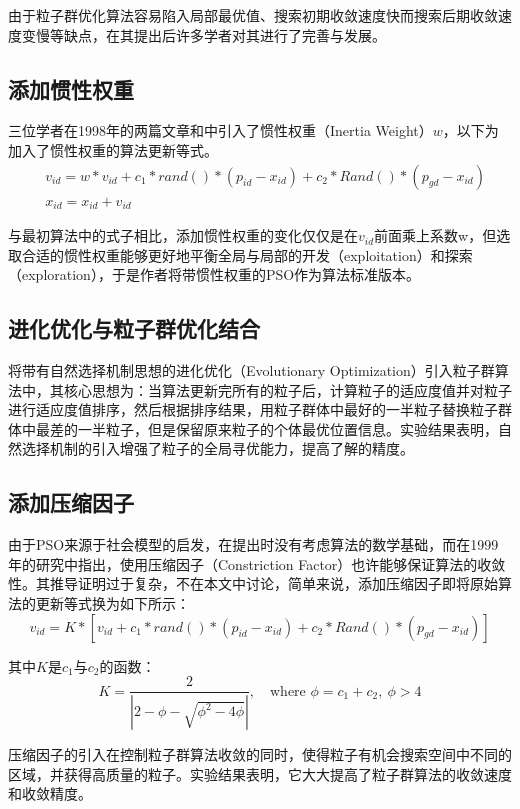 \documentclass[lang=cn,12pt,a4paper,cite=authoryear]{elegantpaper}
\begin{document}
由于粒子群优化算法容易陷入局部最优值、搜索初期收敛速度快而搜索后期收敛速度变慢等缺点，在其提出后许多学者对其进行了完善与发展。

\subsection{添加惯性权重}

三位学者在1998年的两篇文章\citep{shi1998modified}和\citep{shi1998parameter}中引入了惯性权重（Inertia Weight）$w$，以下为加入了惯性权重的算法更新等式。
\begin{align*}
& v_{id} = w*v_{id} + c_1 * rand() * (p_{id} - x_{id}) + c_2 * Rand() * (p_{gd} - x_{id})\\
& x_{id} = x_{id} + v_{id}
\end{align*}

与最初算法中的式子相比，添加惯性权重的变化仅仅是在$v_{id}$前面乘上系数w，但选取合适的惯性权重能够更好地平衡全局与局部的开发（exploitation）和探索（exploration），于是作者将带惯性权重的PSO作为算法标准版本。

\subsection{进化优化与粒子群优化结合}

\cite{angeline1998evolutionary}将带有自然选择机制思想的进化优化（Evolutionary Optimization）引入粒子群算法中，其核心思想为：当算法更新完所有的粒子后，计算粒子的适应度值并对粒子进行适应度值排序，然后根据排序结果，用粒子群体中最好的一半粒子替换粒子群体中最差的一半粒子，但是保留原来粒子的个体最优位置信息。实验结果表明，自然选择机制的引入增强了粒子的全局寻优能力，提高了解的精度。

\subsection{添加压缩因子}

由于PSO来源于社会模型的启发，在提出时没有考虑算法的数学基础，而\cite{clerc2002particle}在1999年的研究中指出，使用压缩因子（Constriction Factor）也许能够保证算法的收敛性。其推导证明过于复杂，不在本文中讨论，简单来说，添加压缩因子即将原始算法的更新等式换为如下所示：
$$v_{id} = K*[v_{id} + c_1 * rand() * (p_{id} - x_{id}) + c_2 * Rand() * (p_{gd} - x_{id})]$$

其中$K$是$c_1$与$c_2$的函数：
$$K = \frac{2}{|2-\phi - \sqrt{\phi^2 - 4\phi}|}, \quad \text{where } \phi = c_1+c_2, \ \phi > 4$$

压缩因子的引入在控制粒子群算法收敛的同时，使得粒子有机会搜索空间中不同的区域，并获得高质量的粒子。实验结果表明，它大大提高了粒子群算法的收敛速度和收敛精度。
\end{document}
